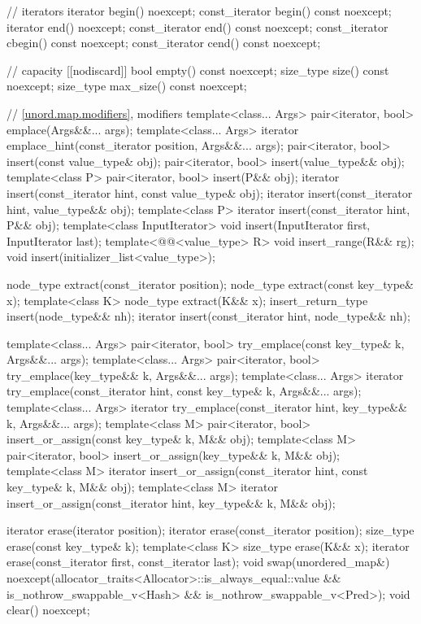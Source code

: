 \begin{codeblock}
{{    // iterators
    iterator       begin() noexcept;
    const_iterator begin() const noexcept;
    iterator       end() noexcept;
    const_iterator end() const noexcept;
    const_iterator cbegin() const noexcept;
    const_iterator cend() const noexcept;

    // capacity
    [[nodiscard]] bool empty() const noexcept;
    size_type size() const noexcept;
    size_type max_size() const noexcept;

    // \ref{unord.map.modifiers}, modifiers
    template<class... Args> pair<iterator, bool> emplace(Args&&... args);
    template<class... Args> iterator emplace_hint(const_iterator position, Args&&... args);
    pair<iterator, bool> insert(const value_type& obj);
    pair<iterator, bool> insert(value_type&& obj);
    template<class P> pair<iterator, bool> insert(P&& obj);
    iterator       insert(const_iterator hint, const value_type& obj);
    iterator       insert(const_iterator hint, value_type&& obj);
    template<class P> iterator insert(const_iterator hint, P&& obj);
    template<class InputIterator> void insert(InputIterator first, InputIterator last);
    template<@@<value_type> R>
      void insert_range(R&& rg);
    void insert(initializer_list<value_type>);

    node_type extract(const_iterator position);
    node_type extract(const key_type& x);
    template<class K> node_type extract(K&& x);
    insert_return_type insert(node_type&& nh);
    iterator           insert(const_iterator hint, node_type&& nh);

    template<class... Args>
      pair<iterator, bool> try_emplace(const key_type& k, Args&&... args);
    template<class... Args>
      pair<iterator, bool> try_emplace(key_type&& k, Args&&... args);
    template<class... Args>
      iterator try_emplace(const_iterator hint, const key_type& k, Args&&... args);
    template<class... Args>
      iterator try_emplace(const_iterator hint, key_type&& k, Args&&... args);
    template<class M>
      pair<iterator, bool> insert_or_assign(const key_type& k, M&& obj);
    template<class M>
      pair<iterator, bool> insert_or_assign(key_type&& k, M&& obj);
    template<class M>
      iterator insert_or_assign(const_iterator hint, const key_type& k, M&& obj);
    template<class M>
      iterator insert_or_assign(const_iterator hint, key_type&& k, M&& obj);

    iterator  erase(iterator position);
    iterator  erase(const_iterator position);
    size_type erase(const key_type& k);
    template<class K> size_type erase(K&& x);
    iterator  erase(const_iterator first, const_iterator last);
    void      swap(unordered_map&)
      noexcept(allocator_traits<Allocator>::is_always_equal::value &&
               is_nothrow_swappable_v<Hash> &&
               is_nothrow_swappable_v<Pred>);
    void      clear() noexcept;

}}
\end{codeblock}
